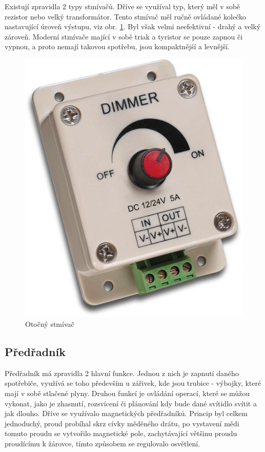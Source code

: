 \documentclass[FM,RP]{tulthesis}
\begin{document}
  
  Existují zpravidla 2 typy stmívačů. Dříve se využíval typ, který měl v sobě rezistor nebo velký transformátor. Tento stmívač měl ručně ovládané kolečko nastavující úroveň výstupu, viz obr. \ref{dimmerotocny}. Byl však velmi neefektivní - drahý a velký zároveň. Moderní stmívače mající v sobě triak a tyristor se pouze zapnou či vypnou, a proto nemají takovou spotřebu, jsou kompaktnější a levnější.
    \vspace{2em}
   \begin{figure}[h]
   	\begin{center}
   		\includegraphics[scale=0.15]{Dimmer-1224-Volt1.jpg}
   		\caption{Otočný stmívač}
   		\label{dimmerotocny}
   	\end{center}
   \end{figure}
   \newpage
    
     
   
  \subsection{Předřadník}
  Předřadník má zpravidla 2 hlavní funkce. Jednou z nich je zapnutí daného spotřebiče, využívá se toho především u zářivek, kde jsou trubice - výbojky, které mají v sobě stlačené plyny. Druhou funkcí je ovládání operací, které se můžou vykonat, jako je zhasnutí, rozsvícení či plánování kdy bude dané svítidlo svítit a jak dlouho. Dříve se využívalo magnetických předřadníků. Princip byl celkem jednoduchý, proud probíhal skrz cívky měděného drátu, po vystavení mědi tomuto proudu se vytvořilo magnetické pole, zachytávající většinu proudu proudícímu k žárovce, tímto způsobem se regulovalo osvětlení.
    
\end{document}
